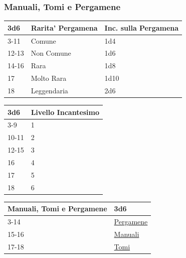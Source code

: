 \begin{multicols}{2}
{\subsubsection{Manuali, Tomi e Pergamene}\hypertarget{manualitomi}{}\label{manualitomi}\label{CPergamene}\hypertarget{CPergamene}{}

{\small \begin{tabularx}{\linewidth}{lll}
		\toprule
\rowcolor{gray!20}\textbf{3d6} & \textbf{Rarita' Pergamena} & \textbf{Inc. sulla Pergamena}\\
\toprule
3-11 &Comune & 1d4 \\
\rowcolor{gray!20}12-13 &Non Comune & 1d6 \\
14-16 &Rara & 1d8 \\
\rowcolor{gray!20}17 & Molto Rara & 1d10\\
18 & Leggendaria & 2d6\\
\end{tabularx}}

\medskip

{\small \begin{tabularx}{\linewidth}{ll}
		\toprule
 \rowcolor{gray!20}\textbf{3d6} & \textbf{Livello Incantesimo}\\
	\toprule
	3-9 & 1 \\
 \rowcolor{gray!20}10-11 & 2 \\
	12-15 & 3  \\
 \rowcolor{gray!20}16 & 4  \\
	17 & 5 \\
 \rowcolor{gray!20}18 & 6 \\
\end{tabularx}}

\medskip

{\small\begin{tabularx}{\linewidth}{ll}
		\toprule
  \rowcolor{gray!20}\textbf{Manuali, Tomi e Pergamene}&\textbf{3d6}\\
		\toprule
3-14 &	\hyperlink{manualitomi}{Pergamene}\\
\rowcolor{gray!20}15-16&	\hyperlink{manualitomi}{Manuali} \\
17-18&	\hyperlink{manualitomi}{Tomi}
\end{tabularx}}

\medskip\hypertarget{Manuali}{}

}
\end{multicols}
